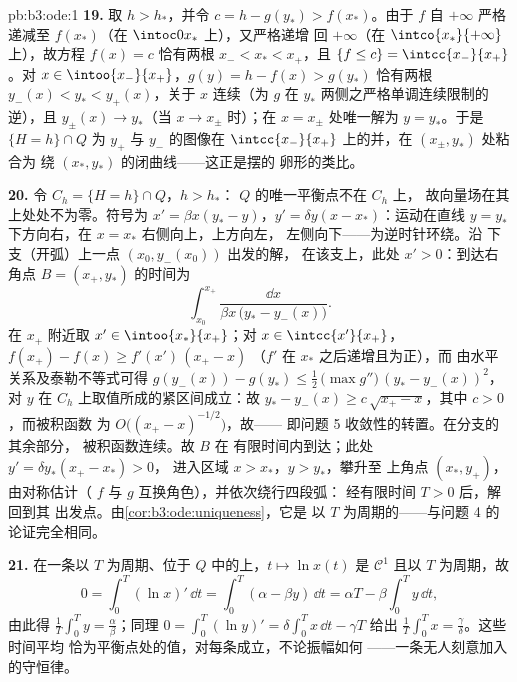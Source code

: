\begin{solution}{pb:b3:ode:1}
\textbf{19.} 取 $h > h_*$，并令 $c = h - g(y_*) >
f(x_*)$。由于 $f$ 自 $+\infty$ 严格递减至
$f(x_*)$（在 $\intoc0{x_*}$ 上），又严格递增
回 $+\infty$（在 $\intco{x_*}{+\infty}$ 上），故方程 $f(x) = c$
恰有两根 $x_- < x_* < x_+$，且 $\{f \leq c\} =
\intcc{x_-}{x_+}$。对 $x \in \intoo{x_-}{x_+}$，$g(y) = h -
f(x) > g(y_*)$ 恰有两根 $y_-(x) < y_* <
y_+(x)$，关于 $x$ 连续（为
$g$ 在
$y_*$ 两侧之严格单调连续限制的逆），且 $y_\pm(x) \to y_*$（当 $x \to x_\pm$ 时）；在 $x =
x_\pm$ 处唯一解为 $y = y_*$。于是 $\{H = h\}\cap
Q$ 为 $y_+$ 与 $y_-$ 的图像在
$\intcc{x_-}{x_+}$ 上的并，在 $(x_\pm, y_*)$ 处粘合为
绕 $(x_*, y_*)$ 的闭曲线——这正是摆的
卵形的类比。

\textbf{20.} 令 $C_h = \{H = h\}\cap Q$，$h > h_*$：
$Q$ 的唯一平衡点不在 $C_h$ 上，
故向量场在其上处处不为零。符号为 $x' = \beta x(y_* - y)$，$y' =
\delta y(x - x_*)$：运动在直线 $y
= y_*$ 下方向右，在 $x = x_*$ 右侧向上，上方向左，
左侧向下——为逆时针环绕。沿
下支（开弧）上一点 $(x_0, y_-(x_0))$ 出发的解，
在该支上，此处 $x' > 0$：到达右角点
$B = (x_+, y_*)$ 的时间为
\[
\int_{x_0}^{x_+}\frac{\dd x}{\beta x\,\bigl(y_* -
y_-(x)\bigr)} .
\]
在 $x_+$ 附近取 $x' \in \intoo{x_*}{x_+}$；对 $x \in
\intcc{x'}{x_+}$，$f(x_+) - f(x) \geq f'(x')\,(x_+ - x)$
（$f'$ 在 $x_*$ 之后递增且为正），而
由水平关系及泰勒不等式可得 $g(y_-(x)) -
g(y_*) \leq \frac12\,\bigl(\max g''\bigr)\,(y_* -
y_-(x))^2$，对 $y$ 在 $C_h$ 上取值所成的紧区间成立：故 $y_* -
y_-(x) \geq c\,\sqrt{x_+ - x}$，其中 $c > 0$，而被积函数
为 $O\bigl((x_+ - x)^{-1/2}\bigr)$，故——
即问题 5 收敛性的转置。在分支的其余部分，
被积函数连续。故 $B$ 在
有限时间内到达；此处 $y' = \delta y_*(x_+ - x_*) > 0$，
进入区域 $x > x_*$，$y > y_*$，攀升至
上角点 $(x_*, y_+)$，由对称估计（
$f$ 与 $g$ 互换角色），并依次绕行四段弧：
经有限时间 $T > 0$ 后，解回到其
出发点。由\cref{cor:b3:ode:uniqueness}，它是
以 $T$ 为周期的——与问题 4 的论证完全相同。

\textbf{21.} 在一条以 $T$ 为周期、位于 $Q$ 中的上，$t \mapsto \ln
x(t)$ 是 $\mathcal C^1$ 且以 $T$ 为周期，故
\[
0 = \int_0^T(\ln x)'\,\dd t
= \int_0^T(\alpha - \beta y)\,\dd t
= \alpha T - \beta\int_0^Ty\,\dd t ,
\]
由此得 $\frac1T\int_0^Ty = \frac\alpha\beta$；同理 $0 =
\int_0^T(\ln y)' = \delta\int_0^Tx\,\dd t - \gamma T$ 给出
$\frac1T\int_0^Tx = \frac\gamma\delta$。这些时间平均
恰为平衡点处的值，对每条成立，不论振幅如何
——一条无人刻意加入的守恒律。


\end{solution}

